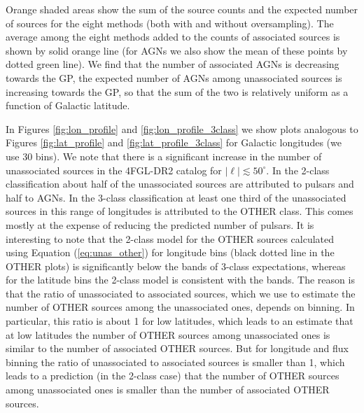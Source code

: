 Orange shaded areas show the sum of the source counts and the expected number of sources for the eight methods (both with and without oversampling).
The average among the eight methods added to the counts of associated sources is shown by solid orange line 
(for AGNs we also show the mean of these points by dotted green line).
We find that the number of associated AGNs is decreasing towards the GP, the expected number of AGNs among unassociated sources is increasing towards the GP, so that the sum of the two is relatively uniform as a function of Galactic latitude.


In Figures \ref{fig:lon_profile} and \ref{fig:lon_profile_3class} we show plots analogous to Figures \ref{fig:lat_profile} and \ref{fig:lat_profile_3class} for Galactic longitudes (we use 30 bins).
We note that there is a significant increase in the number of unassociated sources in the 4FGL-DR2  catalog for $|\ell | \lesssim 50^\circ$.
In the 2-class classification about half of the unassociated sources are attributed to pulsars and half to AGNs.
In the 3-class classification at least one third of the unassociated sources in this range of longitudes is attributed to the OTHER class.
This comes mostly at the expense of reducing the predicted number of pulsars.
It is interesting to note that the 2-class model for the OTHER sources calculated using Equation (\ref{eq:unas_other}) for longitude bins
(black dotted line in the OTHER plots) is significantly below the bands of 3-class expectations, whereas for the latitude bins the 2-class model
is consistent with the bands.
The reason is that the ratio of unassociated to associated sources, which we use to estimate the number of OTHER sources among the unassociated ones, depends on binning.
In particular, this ratio is about 1 for low latitudes, which leads to an estimate that at low latitudes the number of OTHER sources among unassociated ones is similar to the number of associated OTHER sources.
But for longitude and flux binning the ratio of unassociated to associated sources is smaller than 1, which leads to a prediction (in the 2-class case) that the number of OTHER sources among unassociated ones is smaller than the number of associated OTHER sources.

